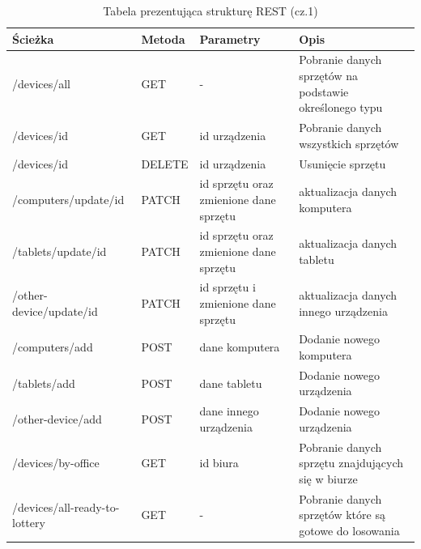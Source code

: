 \begin{table}[H]\small
	\centering
\caption{Tabela prezentująca strukturę REST (cz.1)}
\label{tab:rest1}
\begin{tabularx}{\linewidth}{|X|l|p{3cm}|X|}
    \hline
    Ścieżka & Metoda & Parametry & Opis  \\
    \hline \hline
		/devices/all 	& GET & - & Pobranie danych sprzętów na podstawie określonego typu \\
		\hline
		/devices/{id} & GET & id urządzenia 	& Pobranie danych wszystkich sprzętów\\
    \hline
		/devices/{id}	& DELETE & id urządzenia 	& Usunięcie sprzętu\\
    \hline
		 /computers/update/id & PATCH & id sprzętu oraz zmienione dane sprzętu& aktualizacja danych komputera\\
		\hline
		 /tablets/update/id & PATCH & id sprzętu oraz zmienione dane sprzętu& aktualizacja danych tabletu\\
		\hline	 
		/other-device/update/id & PATCH & id sprzętu i zmienione dane sprzętu & aktualizacja danych innego urządzenia\\
		\hline
			 /computers/add & POST	& dane komputera 	& Dodanie nowego komputera	\\
    \hline
		/tablets/add & POST	& dane tabletu & Dodanie nowego urządzenia	\\
    \hline
		/other-device/add & POST	& dane innego urządzenia 	& Dodanie nowego urządzenia	\\
    \hline
		/devices/by-office& GET	& id biura 	& Pobranie danych sprzętu znajdujących się w biurze\\
    \hline
		/devices/all-ready-to-lottery& GET	& - & Pobranie danych sprzętów które są gotowe do losowania\\
    \hline
		

\end{tabularx}
\end{table}
